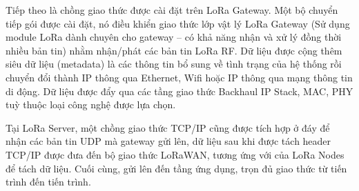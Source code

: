 	Tiếp theo là chồng giao thức được cài đặt trên LoRa Gateway. Một bộ chuyển tiếp gói được cài đặt, nó điều khiển giao thức lớp vật lý LoRa Gateway (Sử dụng module LoRa dành chuyên cho gateway – có khả năng nhận và xử lý đồng thời nhiều bản tin) nhằm nhận/phát các bản tin LoRa RF. Dữ liệu được cộng thêm siêu dữ liệu (metadata) là các thông tin bổ sung về tình trạng của hệ thống rồi chuyển đổi thành IP thông qua Ethernet, Wifi hoặc IP thông qua mạng thông tin di động. Dữ liệu được đẩy qua các tầng giao thức Backhaul IP Stack, MAC, PHY tuỳ thuộc loại công nghệ được lựa chọn. \par
	Tại LoRa Server, một chồng giao thức TCP/IP cũng được tích hợp ở đáy để nhận các bản tin UDP mà gateway gửi lên, dữ liệu sau khi được tách header TCP/IP được đưa đến bộ giao thức LoRaWAN, tương ứng với của LoRa Nodes để tách dữ liệu. Cuối cùng, gửi lên đến tầng ứng dụng, trọn đủ giao thức từ tiến trình đến tiến trình.
	
